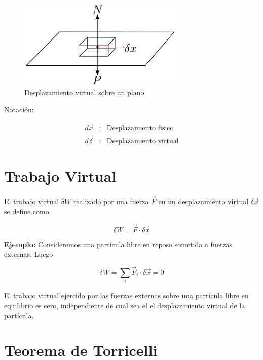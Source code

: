 \documentclass[12pt]{report}
\begin{document}
\begin{figure}[H]
	\begin{center}
	\includegraphics[width=8cm]{figura27.png} 
	\caption{ Desplazamiento virtual sobre un plano.}
	\label{fig.1}
	\end{center}
\end{figure}

Notación:

\begin{eqnarray}
d\vec{x} &:& \textrm{Desplazamiento fisico} \\
d\vec{\delta} &:& \textrm{Desplazamiento virtual}
\end{eqnarray}



\section{Trabajo Virtual}

El trabajo virtual $\delta W$ realizado por una fuerza $\vec{F}$ en un desplazamiento virtual $\delta \vec{x}$ se define como


\begin{equation}
\delta W=\vec{F} \cdot \delta\vec{x}
\end{equation}


\textbf{Ejemplo:} Consideremos una partícula libre en reposo sometida a fuerzas externas. Luego

\begin{equation}
\delta W = \sum_{i} \vec{F}_i \cdot \delta\vec{x}=0
\end{equation}


El trabajo virtual ejercido por las fuerzas externas sobre una partícula libre en equilibrio es cero, independiente  de cual sea el el desplazamiento virtual de la partícula. 









\section{Teorema de Torricelli}
\end{document}
